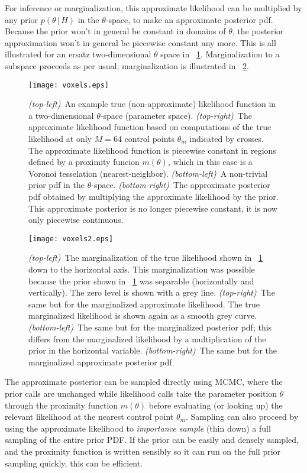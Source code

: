\documentclass[12pt]{article}
\newcommand{\given}{\,|\,}
\begin{document}
For inference or marginalization, this approximate likelihood can be
multiplied by any prior $p(\theta\given H)$ in the $\theta$-space, to
make an approximate posterior pdf.  Because the prior won't in general
be constant in domains of $\theta$, the posterior approximation won't
in general be piecewise constant any more.  This is all illustrated
for an ersatz two-dimensional $\theta$ space in
\figurename~\ref{fig:posterior}.  Marginalization to a subspace
proceeds as per usual; marginalization is illustrated in
\figurename~\ref{fig:marginal}.

\begin{figure}[p]
\texttt{[image: voxels.eps]}
\caption{\textsl{(top-left)}~An example true (non-approximate)
  likelihood function in a two-dimensional $\theta$-space (parameter
  space). \textsl{(top-right)}~The approximate likelihood function
  based on computations of the true likelihood at only $M=64$ control
  points $\theta_m$ indicated by crosses.  The approximate likelihood
  function is piecewise constant in regions defined by a proximity
  funcion $m(\theta)$, which in this case is a Voronoi tesselation
  (nearest-neighbor).  \textsl{(bottom-left)}~A non-trivial prior pdf
  in the $\theta$-space.  \textsl{(bottom-right)}~The approximate
  posterior pdf obtained by multiplying the approximate likelihood by
  the prior.  This approximate posterior is no longer piecewise
  constant, it is now only piecewise continuous.\label{fig:posterior}}
\end{figure}

\begin{figure}[p]
\texttt{[image: voxels2.eps]}
\caption{\textsl{(top-left)}~The marginalization of the true
  likelihood shown in \figurename~\ref{fig:posterior} down to the
  horizontal axis.  This marginalization was possible because the
  prior shown in \figurename~\ref{fig:posterior} was separable
  (horizontally and vertically).  The zero level is shown with a grey
  line.  \textsl{(top-right)}~The same but for the marginalized
  approximate likelihood.  The true marginalized likelihood is shown
  again as a smooth grey curve.  \textsl{(bottom-left)}~The same but
  for the marginalized posterior pdf; this differs from the
  marginalized likelihood by a multiplication of the prior in the
  horizontal variable.  \textsl{(bottom-right)}~The same but for the
  marginalized approximate posterior pdf.\label{fig:marginal}}
\end{figure}

The approximate posterior can be sampled directly using MCMC, where
the prior calls are unchanged while likelihood calls take the
parameter position $\theta$ through the proximity function $m(\theta)$
before evaluating (or looking up) the relevant likelihood at the
nearest control point $\theta_m$.  Sampling can also proceed by using
the approximate likelihood to \emph{importance sample} (thin down) a
full sampling of the entire prior PDF.  If the prior can be easily and
densely sampled, and the proximity function is written sensibly so it
can run on the full prior sampling quickly, this can be efficient.
\end{document}
